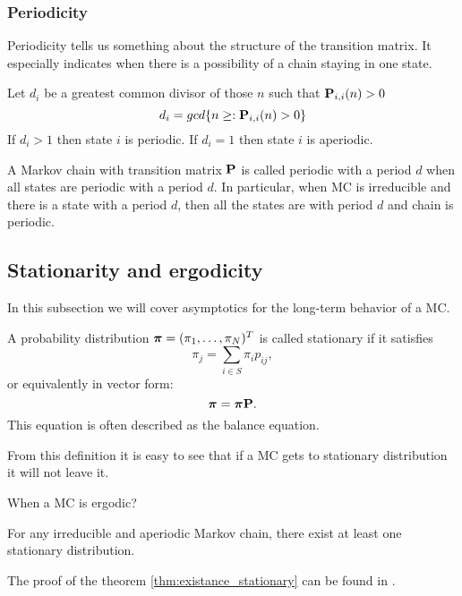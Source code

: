 	\subsubsection{Periodicity}
		Periodicity tells us something about the structure of the transition matrix. It especially indicates when there is a possibility of a chain staying in one state.
		\begin{definition}[Periodicity]
			Let $d_i$ be a greatest common divisor of those $n$ such that $\mathbf{P}_{i,i}(n)>0$ \ie
			\begin{equation*}
				d_i = gcd\{ n \geq : \mathbf{P}_{i,i}(n)>0 \}
			\end{equation*}
			If $d_i > 1$ then state $i$ is periodic. If $d_i = 1$ then state $i$ is aperiodic.
		\end{definition}
	
		\begin{definition}
			A Markov chain with transition matrix $\mathbf{P}$ is called periodic with a period $d$ when all states are periodic with a period $d$. In particular, when MC is irreducible and there is a state with a period $d$, then all the states are with period $d$ and chain is periodic.
		\end{definition}	
	

\subsection{Stationarity and ergodicity}
	In this subsection we will cover asymptotics for the long-term behavior of a MC.
	\begin{definition}[Stationarity]
		A probability distribution $\boldsymbol{\pi} = (\pi_1, \ldots, \pi_N)^T$ is called stationary if it satisfies
		\begin{equation*}
			\pi_j = \sum_{i \in S} \pi_i p_{ij},
		\end{equation*}
		or equivalently in vector form:
		\begin{equation*}
			\boldsymbol{\pi} = \boldsymbol{\pi} \mathbf{P}.
		\end{equation*}
		This equation is often described as the balance equation.
	\end{definition}
	From this definition it is easy to see that if a MC gets to stationary distribution it will not leave it. 
	
	\begin{definition}[Ergodicity]
		When a MC is ergodic?
	\end{definition}
	
	\begin{theorem} \label{thm:existance_stationary}
		For any irreducible and aperiodic Markov chain, there exist at least one stationary distribution.
	\end{theorem}
	The proof of the theorem \ref{thm:existance_stationary} can be found in \cite{haggstrom2002finite}.
	
